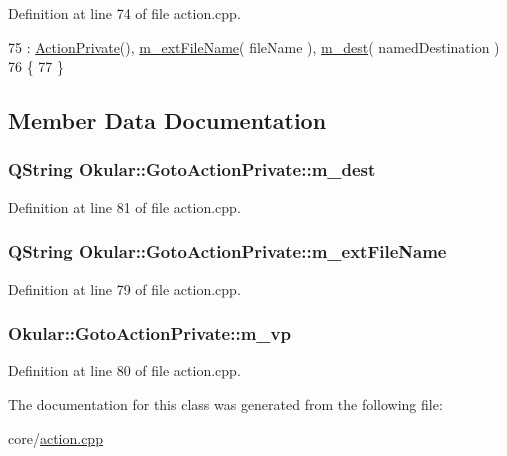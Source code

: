 Definition at line 74 of file action.\+cpp.


\begin{DoxyCode}
75             : \hyperlink{classOkular_1_1ActionPrivate_ade22b7b9b9f6490b2fce5b928235ef5b}{ActionPrivate}(), \hyperlink{classOkular_1_1GotoActionPrivate_acdb8f2ef61dcff5ceb88cbde7a1e806e}{m\_extFileName}( fileName ), 
      \hyperlink{classOkular_1_1GotoActionPrivate_a48016ac441818d2bcda8d08a2b390867}{m\_dest}( namedDestination )
76         \{
77         \}
\end{DoxyCode}


\subsection{Member Data Documentation}
\hypertarget{classOkular_1_1GotoActionPrivate_a48016ac441818d2bcda8d08a2b390867}{
\subsubsection[{m\+\_\+dest}]{\setlength{\rightskip}{0pt plus 5cm}Q\+String Okular\+::\+Goto\+Action\+Private\+::m\+\_\+dest}}\label{classOkular_1_1GotoActionPrivate_a48016ac441818d2bcda8d08a2b390867}


Definition at line 81 of file action.\+cpp.

\hypertarget{classOkular_1_1GotoActionPrivate_acdb8f2ef61dcff5ceb88cbde7a1e806e}{
\subsubsection[{m\+\_\+ext\+File\+Name}]{\setlength{\rightskip}{0pt plus 5cm}Q\+String Okular\+::\+Goto\+Action\+Private\+::m\+\_\+ext\+File\+Name}}\label{classOkular_1_1GotoActionPrivate_acdb8f2ef61dcff5ceb88cbde7a1e806e}


Definition at line 79 of file action.\+cpp.

\hypertarget{classOkular_1_1GotoActionPrivate_a6277974042170f5495e316d07117c1c5}{
\subsubsection[{m\+\_\+vp}]{ Okular\+::\+Goto\+Action\+Private\+::m\+\_\+vp}}\label{classOkular_1_1GotoActionPrivate_a6277974042170f5495e316d07117c1c5}


Definition at line 80 of file action.\+cpp.



The documentation for this class was generated from the following file\+:\begin{DoxyCompactItemize}
\item 
core/\hyperlink{action_8cpp}{action.\+cpp}\end{DoxyCompactItemize}
